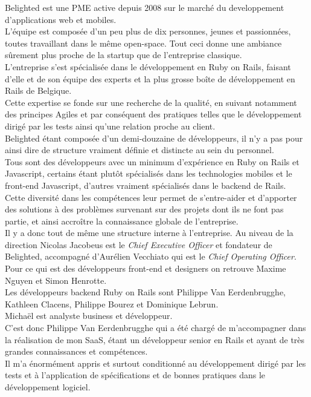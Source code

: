 \documentclass{report}
\begin{document}
  Belighted est une PME active depuis 2008 sur le marché du developpement d'applications web et mobiles.\\
  L'équipe est composée d'un peu plus de dix personnes, jeunes et passionnées, toutes travaillant dans le même open-space. Tout ceci donne
  une ambiance sûrement plus proche de la startup que de l'entreprise classique.\\

  L'entreprise s'est spécialisée dans le développement en Ruby on Rails, faisant d'elle et de son équipe des experts et la plus grosse
  boîte de développement en Rails de Belgique.\\
  Cette expertise se fonde sur une recherche de la qualité, en suivant notamment des principes Agiles et par conséquent des pratiques
  telles que le développement dirigé par les tests ainsi qu'une relation proche au client.\\

  Belighted étant composée d'un demi-douzaine de développeurs, il n'y a pas pour ainsi dire de structure vraiment définie et distincte au sein du personnel. \\
  Tous sont des développeurs avec un minimum d'expérience en Ruby on Rails et Javascript, certains étant plutôt spécialisés dans les technologies mobiles et le front-end Javascript,
  d'autres vraiment spécialisés dans le backend de Rails. \\
  Cette diversité dans les compétences leur permet de s'entre-aider et d'apporter des solutions à des problèmes survenant sur des projets dont ils ne font pas partie, et ainsi
  accroître la connaissance globale de l'entreprise. \\

  Il y a donc tout de même une structure interne à l'entreprise. Au niveau de la direction Nicolas Jacobeus est le \textit{Chief Executive Officer} et fondateur de Belighted, accompagné
  d'Aurélien Vecchiato qui est le \textit{Chief Operating Officer}.\\
  Pour ce qui est des développeurs front-end et designers on retrouve Maxime Nguyen et Simon Henrotte. \\
  Les développeurs backend Ruby on Rails sont Philippe Van Eerdenbrugghe, Kathleen Clacens, Philippe Bourez et Dominique Lebrun.\\
  Michaël est analyste business et développeur.\\

  C'est donc Philippe Van Eerdenbrugghe qui a été chargé de m'accompagner dans la réalisation de mon SaaS, étant un développeur senior en Rails et ayant de très grandes connaissances et compétences.\\
  Il m'a énormément appris et surtout conditionné au développement dirigé par les tests et à l'application de spécifications et de bonnes pratiques dans le développement logiciel.\\
\end{document}
